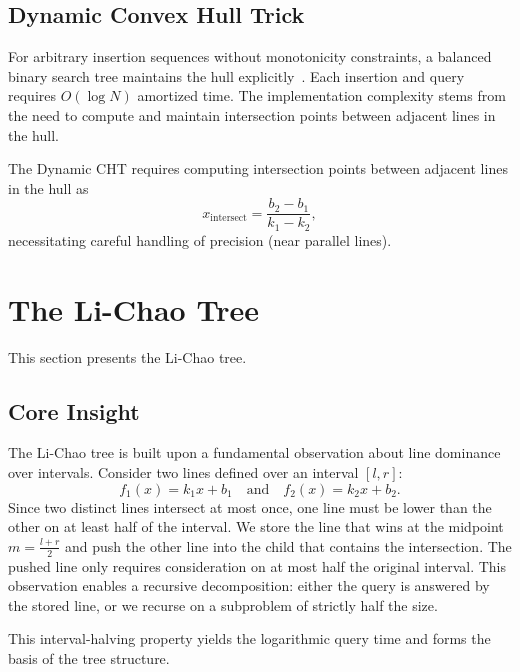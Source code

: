\documentclass[11pt,a4paper]{article}
\theoremstyle{definition}
\theoremstyle{plain}
\begin{document}
\subsection{Dynamic Convex Hull Trick}

For arbitrary insertion sequences without monotonicity constraints, a balanced binary search tree maintains the hull explicitly~\cite{kactl}. Each insertion and query requires $O(\log N)$ amortized time. The implementation complexity stems from the need to compute and maintain intersection points between adjacent lines in the hull.

The Dynamic CHT requires computing intersection points between adjacent lines in the hull as
\[
x_{\text{intersect}} = \frac{b_2 - b_1}{k_1 - k_2},
\]
necessitating careful handling of precision (near parallel lines).

\section{The Li-Chao Tree}\label{sec:lichao}

This section presents the Li-Chao tree.

\subsection{Core Insight}

The Li-Chao tree is built upon a fundamental observation about line dominance over intervals. Consider two lines defined over an interval $[l, r]$:
\[
f_1(x) = k_1x + b_1 \quad \text{and} \quad f_2(x) = k_2x + b_2.
\]
Since two distinct lines intersect at most once, one line must be lower than the other on at least half of the interval. We store the line that wins at the midpoint $m = \frac{l+r}{2}$ and push the other line into the child that contains the intersection. The pushed line only requires consideration on at most half the original interval. This observation enables a recursive decomposition: either the query is answered by the stored line, or we recurse on a subproblem of strictly half the size.

This interval-halving property yields the logarithmic query time and forms the basis of the tree structure.
\end{document}
